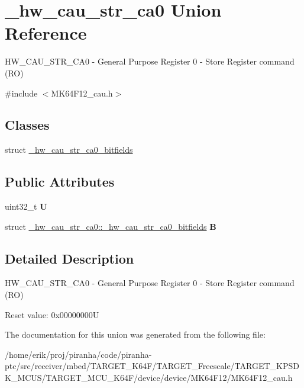 \hypertarget{union__hw__cau__str__ca0}{}\section{\+\_\+hw\+\_\+cau\+\_\+str\+\_\+ca0 Union Reference}
\label{union__hw__cau__str__ca0}


H\+W\+\_\+\+C\+A\+U\+\_\+\+S\+T\+R\+\_\+\+C\+A0 -\/ General Purpose Register 0 -\/ Store Register command (RO)  




{\ttfamily \#include $<$M\+K64\+F12\+\_\+cau.\+h$>$}

\subsection*{Classes}
\begin{DoxyCompactItemize}
\item 
struct \hyperlink{struct__hw__cau__str__ca0_1_1__hw__cau__str__ca0__bitfields}{\+\_\+hw\+\_\+cau\+\_\+str\+\_\+ca0\+\_\+bitfields}
\end{DoxyCompactItemize}
\subsection*{Public Attributes}
\begin{DoxyCompactItemize}
\item 
uint32\+\_\+t {\bfseries U}\hypertarget{union__hw__cau__str__ca0_a89a4393efa82d859b53e9dc6662bb827}{}\label{union__hw__cau__str__ca0_a89a4393efa82d859b53e9dc6662bb827}

\item 
struct \hyperlink{struct__hw__cau__str__ca0_1_1__hw__cau__str__ca0__bitfields}{\+\_\+hw\+\_\+cau\+\_\+str\+\_\+ca0\+::\+\_\+hw\+\_\+cau\+\_\+str\+\_\+ca0\+\_\+bitfields} {\bfseries B}\hypertarget{union__hw__cau__str__ca0_a26f0786f47711b6ddaef2b30645b82cc}{}\label{union__hw__cau__str__ca0_a26f0786f47711b6ddaef2b30645b82cc}

\end{DoxyCompactItemize}


\subsection{Detailed Description}
H\+W\+\_\+\+C\+A\+U\+\_\+\+S\+T\+R\+\_\+\+C\+A0 -\/ General Purpose Register 0 -\/ Store Register command (RO) 

Reset value\+: 0x00000000U 

The documentation for this union was generated from the following file\+:\begin{DoxyCompactItemize}
\item 
/home/erik/proj/piranha/code/piranha-\/ptc/src/receiver/mbed/\+T\+A\+R\+G\+E\+T\+\_\+\+K64\+F/\+T\+A\+R\+G\+E\+T\+\_\+\+Freescale/\+T\+A\+R\+G\+E\+T\+\_\+\+K\+P\+S\+D\+K\+\_\+\+M\+C\+U\+S/\+T\+A\+R\+G\+E\+T\+\_\+\+M\+C\+U\+\_\+\+K64\+F/device/device/\+M\+K64\+F12/M\+K64\+F12\+\_\+cau.\+h\end{DoxyCompactItemize}

